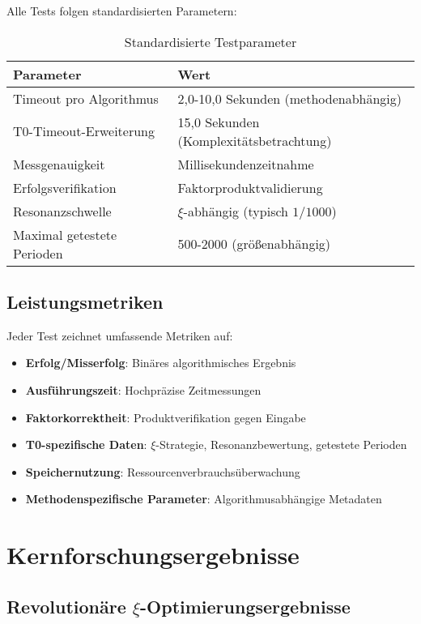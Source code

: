 \documentclass[12pt,a4paper]{article}
\begin{document}
	Alle Tests folgen standardisierten Parametern:
	\begin{table}[H]
		\centering
		\caption{Standardisierte Testparameter}
		\begin{tabular}{ll}
			\toprule
			\textbf{Parameter} & \textbf{Wert} \\
			\midrule
			Timeout pro Algorithmus & 2,0-10,0 Sekunden (methodenabhängig) \\
			T0-Timeout-Erweiterung & 15,0 Sekunden (Komplexitätsbetrachtung) \\
			Messgenauigkeit & Millisekundenzeitnahme \\
			Erfolgsverifikation & Faktorproduktvalidierung \\
			Resonanzschwelle & $\xi$-abhängig (typisch $1/1000$) \\
			Maximal getestete Perioden & 500-2000 (größenabhängig) \\
			\bottomrule
		\end{tabular}
	\end{table}
	
	\subsection{Leistungsmetriken}
	
	Jeder Test zeichnet umfassende Metriken auf:
	\begin{itemize}
		\item \textbf{Erfolg/Misserfolg}: Binäres algorithmisches Ergebnis
		\item \textbf{Ausführungszeit}: Hochpräzise Zeitmessungen
		\item \textbf{Faktorkorrektheit}: Produktverifikation gegen Eingabe
		\item \textbf{T0-spezifische Daten}: $\xi$-Strategie, Resonanzbewertung, getestete Perioden
		\item \textbf{Speichernutzung}: Ressourcenverbrauchsüberwachung
		\item \textbf{Methodenspezifische Parameter}: Algorithmusabhängige Metadaten
	\end{itemize}
	
	\section{Kernforschungsergebnisse}
	
	\subsection{Revolutionäre $\xi$-Optimierungsergebnisse}
	
\end{document}
